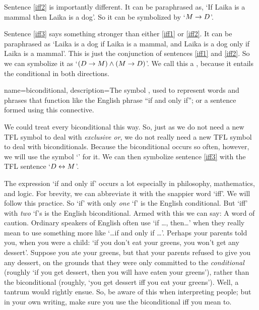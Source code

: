 Sentence \ref{iff2} is importantly different. It can be paraphrased as, `If Laika is a mammal then Laika is a dog'. So it can be symbolized by `$M \rightarrow D$'.

Sentence \ref{iff3} says something stronger than either \ref{iff1} or \ref{iff2}. It can be paraphrased as `Laika is a dog if Laika is a mammal, and Laika is a dog only if Laika is a mammal'. This is just the conjunction of sentences \ref{iff1} and \ref{iff2}. So we can symbolize it as `$(D \rightarrow M) \wedge (M \rightarrow D)$'. We call this a , because it entails the conditional in both directions. 

{
name=biconditional,
description={The symbol \eiff, used to represent words and phrases that function like the English phrase ``if and only if''; or a sentence formed using this connective.}
}

We could treat every biconditional this way. So, just as we do not need a new TFL symbol to deal with \emph{exclusive or}, we do not really need a new TFL symbol to deal with biconditionals. Because the biconditional occurs so often, however, we will use the symbol `\eiff' for it. We can then symbolize sentence \ref{iff3} with the TFL sentence `$D \leftrightarrow M$'. 

The expression `if and only if' occurs a lot especially in philosophy, mathematics, and logic. For brevity, we can abbreviate it with the snappier word `iff'. We will follow this practice. So `if' with only \emph{one} `f' is the English conditional. But `iff' with \emph{two} `f's is the English biconditional. Armed with this we can say:
A word of caution. Ordinary speakers of English often use `if \ldots, then\ldots' when they really mean to use something more like `\ldots if and only if \ldots'. Perhaps your parents told you, when you were a child: `if you don't eat your greens, you won't get any dessert'. Suppose you ate your greens, but that your parents refused to give you any dessert, on the grounds that they were only committed to the \emph{conditional} (roughly `if you get dessert, then you will have eaten your greens'), rather than the biconditional (roughly, `you get dessert iff you eat your greens'). Well, a tantrum would rightly ensue. So, be aware of this when interpreting people; but in your own writing, make sure you use the biconditional iff you mean to.

